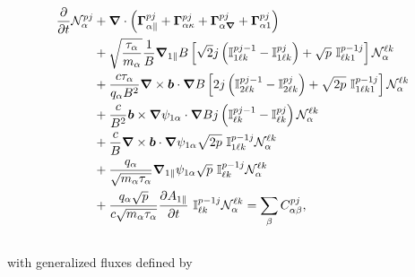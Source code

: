 \documentclass[preprint,12pt]{elsarticle}
\begin{document}
\begin{align} \label{eq:spectralvlasov}
  \frac{\partial}{\partial t} \mathcal{N}_\alpha^{pj} & + \grad \cdot \left(  \bm \Gamma_{\alpha \parallel}^{pj} +\bm \Gamma_{\alpha \kappa}^{pj} + \bm \Gamma_{\alpha \grad}^{pj} + \bm \Gamma_{\alpha 1}^{pj}\right) \nonumber \\
& + \sqrt{\frac{ \tau_\alpha}{m_\alpha}}   \frac{1}{B} \grad_{ 1 \parallel  }B   \left[  \sqrt{2} j \left(   \mathbb{I}^{pj-1}_{1\ell k} - \mathbb{I}^{pj}_{1\ell k}  \right) + \sqrt{p} \ \mathbb{I}^{p-1j}_{\ell k1}  \right]\mathcal{N}_\alpha^{\ell k} \nonumber \\
& +  \frac{ c \tau_\alpha }{q_\alpha B^2} \grad \times \bm b \cdot \grad B   \left[2 j \left(  \mathbb{I}^{pj-1 }_{2\ell k} -  \mathbb{I}^{pj }_{2\ell k} \right) + \sqrt{2p} \ \mathbb{I}^{p-1j}_{1\ell k1}\right] \mathcal{N}_\alpha^{\ell k}  \nonumber \\
&  +  \frac{c}{ B^2 } \bm b \times \grad \psi_{1 \alpha} \cdot \grad B  j \left(  \mathbb{I}^{pj -1}_{\ell k} - \mathbb{I}^{pj }_{\ell k} \right)  \mathcal{N}_\alpha^{\ell k} \nonumber \\
&  +  \frac{ c}{ B} \grad \times \bm b \cdot \grad \psi_{1 \alpha} \sqrt{2p} \ \mathbb{I}^{p-1j }_{1\ell k} \mathcal{N}_\alpha^{\ell k}  \nonumber \\
&  + \frac{q_\alpha}{\sqrt{m_\alpha \tau_\alpha}}  \grad_{ 1 \parallel  } \psi_{1 \alpha} \sqrt{p} \ \mathbb{I}^{p-1j }_{\ell k} \mathcal{N}_\alpha^{\ell k}  \nonumber \\
& + \frac{q_\alpha \sqrt{p}}{c \sqrt{m_\alpha \tau_\alpha}  } \frac{\partial A_{1 \parallel}}{\partial t} \  \mathbb{I}^{p-1j }_{\ell k} \mathcal{N}_\alpha^{\ell k} = \sum_\beta C_{\alpha \beta }^{pj},
\end{align}
\\
with generalized fluxes defined by
\end{document}
